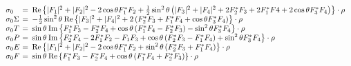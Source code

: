 \documentclass[a4paper,10pt]{article}
\def\cc{^*}
\def\Re{\mathrm{Re}}
\def\Im{\mathrm{Im}}
\begin{document}
\begin{displaymath}\label{frm_Obs}
\begin{array}{lcl}
\sigma_0 &\hspace{-0.67em}=&\hspace{-0.5em} \Re \left\lbrace |F_1|^2 + |F_2|^2 - 2\cos\theta F_1\cc F_2  + \frac{1}{2}\sin^2\theta\left( |F_3|^2 + |F_4|^2 + 2 F_2\cc  F_3    + 2 F_1\cc  F4 + 2\cos\theta F_3\cc F_4\right) \right\rbrace \cdot \rho\\
\sigma_0 \Sigma &\hspace{-0.67em}=&\hspace{-0.5em} - \frac{1}{2}\sin^2\theta\:\Re\left\lbrace|F_3|^2 + |F_4|^2 
                                               + 2\left(F_2\cc F_3 + F_1\cc F_4 
                                               + \cos\theta F_3\cc F_4\right)  
                                               \right\rbrace \cdot \rho\\
\sigma_0 T     &\hspace{-0.67em}=&\hspace{-0.5em} \sin\theta\:\Im \left\lbrace F_1\cc F_3 - F_2\cc F_4 
                                               + \cos\theta\left(F_1\cc F_4 - F_2\cc F_3\right)
                                               - \sin^2\theta F_3\cc F_4
                                               \right\rbrace \cdot \rho\\
\sigma_0 P     &\hspace{-0.67em}=&\hspace{-0.5em} \sin\theta\: \Im\left\lbrace F_2\cc F_4 - 2 F_1\cc F_2 - F_1 F_3
                                               + \cos\theta\left(F_2\cc F_3 - F_1\cc F_4\right) 
                                               + \sin^2\theta F_3\cc F_4
                                               \right\rbrace \cdot \rho\\
\sigma_0 E     &\hspace{-0.67em}=&\hspace{-0.5em} \Re\left\lbrace|F_1|^2 + |F_2|^2 - 2\cos\theta F_1\cc F_2
                                               +\sin^2\theta\left(F_2\cc F_3 + F_1\cc F_4\right)
                                               \right\rbrace \cdot \rho\\
\sigma_0 F     &\hspace{-0.67em}=&\hspace{-0.5em} \sin\theta \:\Re\left\lbrace F_1\cc F_3 - F_2\cc F_4 
                                               + \cos\theta\left(F_1\cc F_4 + F_2\cc F_3\right)
                                                 \right\rbrace \cdot \rho\\

\end{array}
\end{displaymath}
\end{document}
